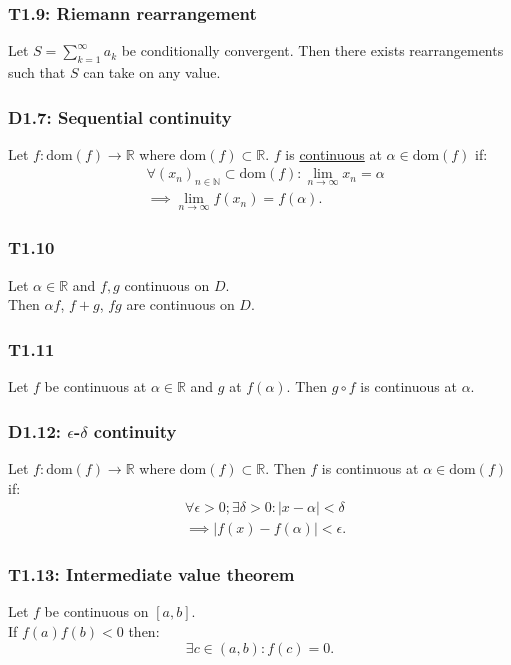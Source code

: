 \documentclass{article}
\begin{document}
\begin{multicols*}{3}
\subsubsection*{T1.9: Riemann rearrangement}
Let $\displaystyle S=\sum_{k=1}^{\infty}a_k$
be conditionally convergent. Then there exists rearrangements
such that $S$ can take on any value.

\subsubsection*{D1.7: Sequential continuity}
Let $f:\text{dom}(f)\rightarrow\mathbb{R}$
where $\text{dom}(f)\subset\mathbb{R}$.
$f$ is \underline{continuous} at $\alpha\in\text{dom}(f)$ if:
\begin{align*}
    &\forall(x_n)_{n\in\mathbb{N}}\subset\text{dom}(f):
    \lim_{n\rightarrow\infty}x_n=\alpha \\
    &\implies\lim_{n\rightarrow\infty}f(x_n)=f(\alpha).
\end{align*}

\subsubsection*{T1.10}
Let $\alpha\in\mathbb{R}$ and $f,g$ continuous on $D$. \\
Then $\alpha f$, $f+g$, $fg$ are continuous on $D$.

\subsubsection*{T1.11}
Let $f$ be continuous at $\alpha\in\mathbb{R}$
and $g$ at $f(\alpha)$.
Then $g\circ f$ is continuous at $\alpha$.

\subsubsection*{D1.12: $\epsilon$-$\delta$ continuity}
Let $f:\text{dom}(f)\rightarrow\mathbb{R}$
where $\text{dom}(f)\subset\mathbb{R}$.
Then $f$ is continuous at $\alpha\in\text{dom}(f)$ if:
\begin{align*}
    &\forall\epsilon>0;\exists\delta>0:
    |x-\alpha|<\delta \\
    &\implies
    |f(x)-f(\alpha)|<\epsilon.
\end{align*}

\subsubsection*{T1.13: Intermediate value theorem}
Let $f$ be continuous on $[a,b]$. \\
If $f(a)f(b)<0$ then:
$$\exists c\in(a,b):f(c)=0.$$


\end{multicols*}
\end{document}
